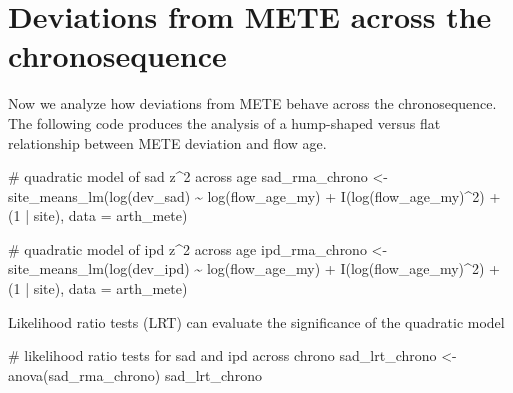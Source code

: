 \documentclass[
  letterpaper,
  DIV=11,
  numbers=noendperiod]{scrartcl}
\newenvironment{Shaded}{\begin{snugshade}}{\end{snugshade}}
\newcommand{\AttributeTok}[1]{\textcolor[rgb]{0.40,0.45,0.13}{#1}}
\newcommand{\CommentTok}[1]{\textcolor[rgb]{0.37,0.37,0.37}{#1}}
\newcommand{\DecValTok}[1]{\textcolor[rgb]{0.68,0.00,0.00}{#1}}
\newcommand{\FunctionTok}[1]{\textcolor[rgb]{0.28,0.35,0.67}{#1}}
\newcommand{\NormalTok}[1]{\textcolor[rgb]{0.00,0.23,0.31}{#1}}
\newcommand{\OtherTok}[1]{\textcolor[rgb]{0.00,0.23,0.31}{#1}}
\newcommand{\SpecialCharTok}[1]{\textcolor[rgb]{0.37,0.37,0.37}{#1}}
\begin{document}
\section{Deviations from METE across the
chronosequence}\label{deviations-from-mete-across-the-chronosequence}

Now we analyze how deviations from METE behave across the
chronosequence. The following code produces the analysis of a
hump-shaped versus flat relationship between METE deviation and flow
age.

\begin{Shaded}
\begin{Highlighting}[]
\CommentTok{\# quadratic model of sad z\^{}2 across age}
\NormalTok{sad\_rma\_chrono }\OtherTok{\textless{}{-}} \FunctionTok{site\_means\_lm}\NormalTok{(}\FunctionTok{log}\NormalTok{(dev\_sad) }\SpecialCharTok{\textasciitilde{}} 
                                    \FunctionTok{log}\NormalTok{(flow\_age\_my) }\SpecialCharTok{+} \FunctionTok{I}\NormalTok{(}\FunctionTok{log}\NormalTok{(flow\_age\_my)}\SpecialCharTok{\^{}}\DecValTok{2}\NormalTok{) }\SpecialCharTok{+} 
\NormalTok{                                    (}\DecValTok{1} \SpecialCharTok{|}\NormalTok{ site),}
                                \AttributeTok{data =}\NormalTok{ arth\_mete)}

\CommentTok{\# quadratic model of ipd z\^{}2 across age}
\NormalTok{ipd\_rma\_chrono }\OtherTok{\textless{}{-}} \FunctionTok{site\_means\_lm}\NormalTok{(}\FunctionTok{log}\NormalTok{(dev\_ipd) }\SpecialCharTok{\textasciitilde{}} 
                                    \FunctionTok{log}\NormalTok{(flow\_age\_my) }\SpecialCharTok{+} \FunctionTok{I}\NormalTok{(}\FunctionTok{log}\NormalTok{(flow\_age\_my)}\SpecialCharTok{\^{}}\DecValTok{2}\NormalTok{) }\SpecialCharTok{+} 
\NormalTok{                                    (}\DecValTok{1} \SpecialCharTok{|}\NormalTok{ site),}
                                \AttributeTok{data =}\NormalTok{ arth\_mete)}
\end{Highlighting}
\end{Shaded}

Likelihood ratio tests (LRT) can evaluate the significance of the
quadratic model

\begin{Shaded}
\begin{Highlighting}[]
\CommentTok{\# likelihood ratio tests for sad and ipd across chrono}
\NormalTok{sad\_lrt\_chrono }\OtherTok{\textless{}{-}} \FunctionTok{anova}\NormalTok{(sad\_rma\_chrono)}
\NormalTok{sad\_lrt\_chrono}
\end{Highlighting}
\end{Shaded}
\end{document}
